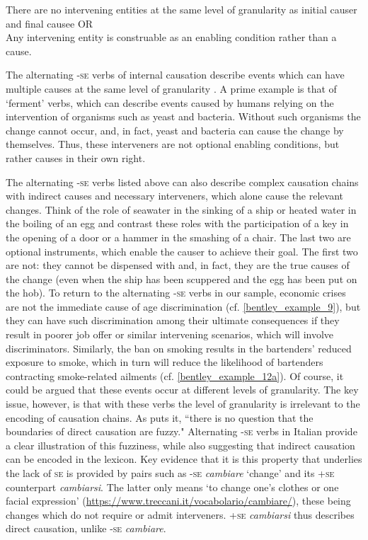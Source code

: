 \documentclass[output=paper,colorlinks,citecolor=brown
]{langscibook}
\begin{document}
\ea \label{bentley_example_13}
    \ea \label{bentley_example_13a}
    \glt There are no intervening entities at the same level of granularity as initial causer and final causee 	OR  \\
    \ex \label{bentley_example_13b}
    \glt Any intervening entity is construable as an enabling condition rather than a cause.  \\
    \z
\z

The alternating -\textsc{se} verbs of internal causation describe events which can have multiple causes at the same level of granularity \citep{bentley2023internally}. A prime example is that of ‘ferment’ verbs, which can describe events caused by humans relying on the intervention of organisms such as yeast and bacteria. Without such organisms the change cannot occur, and, in fact, yeast and bacteria can cause the change by themselves. Thus, these interveners are not optional enabling conditions, but rather causes in their own right. 

The alternating -\textsc{se} verbs listed above can also describe complex causation chains with indirect causes and necessary interveners, which alone cause the relevant changes. Think of the role of seawater in the sinking of a ship or heated water in the boiling of an egg and contrast these roles with the participation of a key in the opening of a door or a hammer in the smashing of a chair. The last two are optional instruments, which enable the causer to achieve their goal. The first two are not: they cannot be dispensed with and, in fact, they are the true causes of the change (even when the ship has been scuppered and the egg has been put on the hob). To return to the alternating -\textsc{se} verbs in our sample, economic crises are not the immediate cause of age discrimination (cf. \ref{bentley_example_9}), but they can have such discrimination among their ultimate consequences if they result in poorer job offer or similar intervening scenarios, which will involve discriminators. Similarly, the ban on smoking results in the bartenders’ reduced exposure to smoke, which in turn will reduce the likelihood of bartenders contracting smoke-related ailments (cf. \ref{bentley_example_12a}). Of course, it could be argued that these events occur at different levels of granularity. The key issue, however, is that with these verbs the level of granularity is irrelevant to the encoding of causation chains. As \citet[477]{kiparsky1997remarks} puts it, “there is no question that the boundaries of direct causation are fuzzy." Alternating -\textsc{se} verbs in Italian provide a clear illustration of this fuzziness, while also suggesting that indirect causation can be encoded in the lexicon. Key evidence that it is this property that underlies the lack of \textsc{se} is provided by pairs such as -\textsc{se} \textit{cambiare} ‘change’ and its +\textsc{se} counterpart \textit{cambiarsi}. The latter only means ‘to change one’s clothes or one facial expression’ (\url{https://www.treccani.it/vocabolario/cambiare/}), these being changes which do not require or admit interveners. +\textsc{se} \textit{cambiarsi} thus describes direct causation, unlike -\textsc{se} \textit{cambiare}. 
\end{document}
